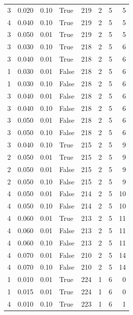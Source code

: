 \documentclass[a4paper,twoside,12pt]{book}
\begin{document}
\begin{table}
\begin{tabular}{rrrlrrrr}
				3 &  0.020 &     0.10 &     True &  219 &  2 &   5 &   5 \\
				4 &  0.040 &     0.10 &     True &  219 &  2 &   5 &   5 \\
				3 &  0.050 &     0.01 &     True &  219 &  2 &   5 &   5 \\
				3 &  0.030 &     0.10 &     True &  218 &  2 &   5 &   6 \\
				3 &  0.040 &     0.01 &     True &  218 &  2 &   5 &   6 \\
				1 &  0.030 &     0.01 &    False &  218 &  2 &   5 &   6 \\
				1 &  0.030 &     0.10 &    False &  218 &  2 &   5 &   6 \\
				3 &  0.040 &     0.01 &    False &  218 &  2 &   5 &   6 \\
				3 &  0.040 &     0.10 &    False &  218 &  2 &   5 &   6 \\
				3 &  0.050 &     0.01 &    False &  218 &  2 &   5 &   6 \\
				3 &  0.050 &     0.10 &    False &  218 &  2 &   5 &   6 \\
				3 &  0.040 &     0.10 &     True &  215 &  2 &   5 &   9 \\
				2 &  0.050 &     0.01 &     True &  215 &  2 &   5 &   9 \\
				2 &  0.050 &     0.01 &    False &  215 &  2 &   5 &   9 \\
				2 &  0.050 &     0.10 &    False &  215 &  2 &   5 &   9 \\
				4 &  0.050 &     0.01 &    False &  214 &  2 &   5 &  10 \\
				4 &  0.050 &     0.10 &    False &  214 &  2 &   5 &  10 \\
				4 &  0.060 &     0.01 &     True &  213 &  2 &   5 &  11 \\
				4 &  0.060 &     0.01 &    False &  213 &  2 &   5 &  11 \\
				4 &  0.060 &     0.10 &    False &  213 &  2 &   5 &  11 \\
				4 &  0.070 &     0.01 &    False &  210 &  2 &   5 &  14 \\
				4 &  0.070 &     0.10 &    False &  210 &  2 &   5 &  14 \\
				1 &  0.010 &     0.01 &     True &  224 &  1 &   6 &   0 \\
				1 &  0.015 &     0.01 &     True &  224 &  1 &   6 &   0 \\
				4 &  0.010 &     0.10 &     True &  223 &  1 &   6 &   1 \\

\end{tabular}
\end{table}
\end{document}
